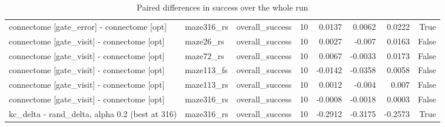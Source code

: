 \begin{table}[t]
\begin{tabular}{lllrrrrr}
connectome [gate\_error] - connectome [opt] & maze316\_rs & overall\_success & 10 & 0.0137 & 0.0062 & 0.0222 & True \\
connectome [gate\_visit] - connectome [opt] & maze26\_rs & overall\_success & 10 & 0.0027 & -0.007 & 0.0163 & False \\
connectome [gate\_visit] - connectome [opt] & maze72\_rs & overall\_success & 10 & 0.0067 & -0.0033 & 0.0173 & False \\
connectome [gate\_visit] - connectome [opt] & maze113\_fs & overall\_success & 10 & -0.0142 & -0.0358 & 0.0058 & False \\
connectome [gate\_visit] - connectome [opt] & maze113\_rs & overall\_success & 10 & 0.0012 & -0.004 & 0.007 & False \\
connectome [gate\_visit] - connectome [opt] & maze316\_rs & overall\_success & 10 & -0.0008 & -0.0018 & 0.0003 & False \\
kc\_delta - rand\_delta, alpha 0.2 (best at 316) & maze316\_rs & overall\_success & 10 & -0.2912 & -0.3175 & -0.2573 & True \\
\bottomrule
\end{tabular}
\caption{Paired differences in success over the whole run}
\label{tab:gridworld_paired_overall}
\end{table}